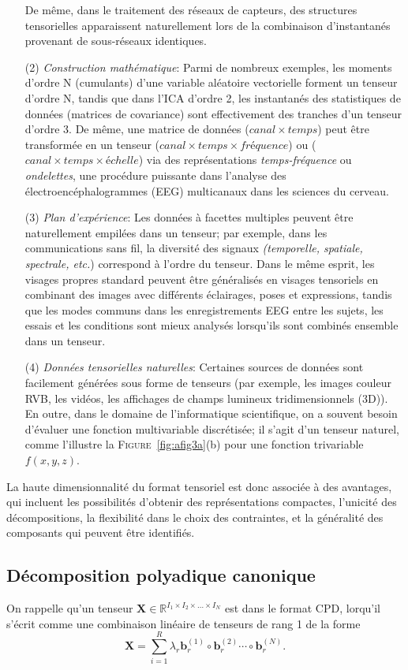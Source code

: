 \documentclass[11pt,a4paper,oneside]{book}
\def\b{\mathbf b}
\def\RItn{\mathbb{R}^{I_1 \times I_2 \times \ldots \times I_N}}
\newcommand{\mbf}[1]{\mathbf{#1}}
\newcommand{\figref}[1]{\textsc{Figure}~\ref{#1}}
\begin{document}
\begin{enumerate}
 De même, dans le traitement des réseaux de capteurs, des structures tensorielles apparaissent naturellement lors de la combinaison d'instantanés provenant de sous-réseaux identiques.
\item[(2)]
\textit{Construction mathématique}: Parmi de nombreux exemples, les moments d'ordre N (cumulants) d'une variable aléatoire vectorielle forment un tenseur d'ordre N, tandis que dans l'ICA d'ordre 2, les instantanés des statistiques de données (matrices de covariance) sont effectivement des tranches d'un tenseur d'ordre 3. De même, une matrice de données ($ canal\times temps $) peut être transformée en un tenseur ($ canal\times temps\times fréquence $) ou ($canal\times temps\times échelle $) via des représentations \textit{temps-fréquence} ou \textit{ondelettes}, une procédure puissante dans l'analyse des électroencéphalogrammes (EEG) multicanaux dans les sciences du cerveau.
\item[(3)]
\textit{Plan d'expérience}: Les données à facettes multiples peuvent être naturellement empilées dans un tenseur; par exemple, dans les communications sans fil, la diversité des signaux \textit{(temporelle, spatiale, spectrale, etc.}) correspond à l'ordre du tenseur. Dans le même esprit, les visages propres standard peuvent être généralisés en visages tensoriels en combinant des images avec différents éclairages, poses et expressions, tandis que les modes communs dans les enregistrements EEG entre les sujets, les essais et les conditions sont mieux analysés lorsqu'ils sont combinés ensemble dans un tenseur.
\item[(4)]
\textit{Données tensorielles naturelles}: Certaines sources de données sont facilement générées sous forme de tenseurs (par exemple, les images couleur RVB, les vidéos, les affichages de champs lumineux tridimensionnels (3D)). En outre, dans le domaine de l'informatique scientifique, on a souvent besoin d'évaluer une fonction multivariable discrétisée; il s'agit d'un tenseur naturel, comme l'illustre la  \figref{fig:afig3a}(b) pour une fonction trivariable $ f(x, y, z) $.
\end{enumerate}
La haute dimensionnalité du format tensoriel est donc associée à des avantages, qui incluent les possibilités d'obtenir des représentations compactes, l'unicité des décompositions, la flexibilité dans le choix des contraintes, et la généralité des composants qui peuvent être identifiés.

\subsection{Décomposition polyadique canonique}
On rappelle  qu'un tenseur $ \mbf{X} \in\RItn$ est dans le format CPD, lorqu'il s'écrit comme une combinaison linéaire de tenseurs de rang 1 de la forme
\begin{equation}\label{3.01}
\mbf{X}=\sum_{i=1}^{R}\lambda_{r}\b_{r}^{(1)}\circ\b_{r}^{(2)}\cdots\circ\b_{r}^{(N)}.
\end{equation}
 
\end{document}
